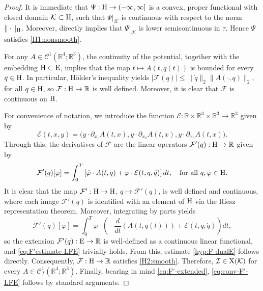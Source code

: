 \documentclass{article}
\newcommand{\boK}{\mathcal{K}}
\newcommand{\boI}{\mathcal{I}}
\newcommand{\R}{\mathbb{R}}
\newcommand{\boF}{\mathcal{F}}
\newcommand{\boE}{\mathcal{E}}
\newcommand{\dq}{\dot{q}}
\newcommand{\Hilb}{{\textnormal H}}
\newcommand{\Ebanach}{{\textnormal E}}
\newcommand{\X}{{\textnormal X}}
\theoremstyle{definition}
\begin{document}
	\begin{proof}
It is immediate that $\Psi:\Hilb \to (-\infty,\infty]$ is a convex, proper functional with closed domain $\boK \subset \Hilb$, such that $\Psi|_\boK$ is continuous with respect to the norm $\|\cdot\|_\Hilb$. Moreover, \cite[Proposition 1]{BerJebMaw-Neumann}  directly implies that $\Psi|_\boK$ is lower semicontinuous in $\tau$. Hence $\Psi$ satisfies \ref{H1:nonsmooth}.
		
For any $A\in\mathcal{C}^1(\R^4;\R^3)$, the continuity of the potential, together with the embedding $\Hilb\subset \Ebanach$, implies that the map $t\mapsto A(t,q(t))$ is bounded for every $q\in\Hilb$. In particular, Hölder's inequality yields $|\boF(q)|\leq\|\dq\|_2 \|A(\cdot,q)\|_2,$ for all $q\in\Hilb$, so $\boF:\Hilb\to\R$ is well defined. Moreover, it is clear that $\boF$ is continuous on $\Hilb$.
		
		For convenience of notation, we introduce the function $\boE:\R\times\R^3\times\R^3\to\R^3$ given by 
		\begin{equation}\label{def:epsF'}
			\boE(t,x,y)=\Big(y\cdot \partial_{x_1}A(t,x),  y\cdot\partial_{x_2} A(t,x), y\cdot \partial_{x_3} A(t,x)\Big).
		\end{equation}
		Through this, the derivatives of $\boF$ are the linear operators $\boF'(q):\Hilb\to\R$ given by
		\begin{equation}\label{eq:F'Hilbert}
			\boF'(q)[\varphi]=\int_0^T \left[\dot{\varphi}\cdot A(t,q)+\varphi\cdot\boE(t,q,\dq)\right]dt,\quad\hbox{for all }q,\varphi\in\Hilb.
		\end{equation}
		It is clear that the map $\boF':\Hilb\to \Hilb$, $q\mapsto \boF'(q)$, is well defined and continuous, where each image $\boF'(q)$ is identified with an element of $\Hilb$ via the Riesz representation theorem. Moreover, integrating by parts yields
			\begin{equation}\label{eq:F'-extended}
            \boF'(q)[\varphi]=\int_0^T\varphi\cdot\left(-\frac{d}{dt}(A(t,q(t)))+\boE(t,q,\dq)\right)dt,
            \end{equation}
			so the extension  $\boF'(q):\Ebanach\to\R$ is well-defined as a  continuous linear functional, and 
			 \eqref{eq:F'estimate-LFE} trivially holds. From this, estimate \eqref{hyp:F-dualE} follows directly. Consequently, $\boF:\Hilb\to\R$ satisfies \ref{H2:smooth}. Therefore, $\boI\in\X(\boK)$ for every $A\in\mathcal{C}^1_T(\R^4;\R^3)$.  Finally, bearing in mind \eqref{eq:F'-extended},  \eqref{eq:conv-F'-LFE} follows by standard arguments.
	\end{proof}
	
\end{document}
